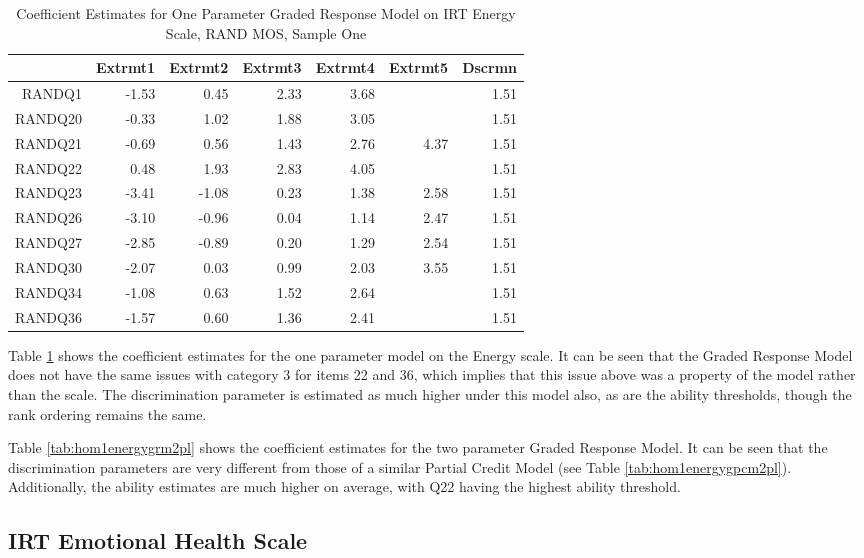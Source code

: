 \documentclass{article}
\begin{document}
\begin{table}[ht]
\centering
\begin{tabular}{rrrrrrr}
  \hline
 & Extrmt1 & Extrmt2 & Extrmt3 & Extrmt4 & Extrmt5 & Dscrmn \\ 
  \hline
RANDQ1 & -1.53 & 0.45 & 2.33 & 3.68 &  & 1.51 \\ 
  RANDQ20 & -0.33 & 1.02 & 1.88 & 3.05 &  & 1.51 \\ 
  RANDQ21 & -0.69 & 0.56 & 1.43 & 2.76 & 4.37 & 1.51 \\ 
  RANDQ22 & 0.48 & 1.93 & 2.83 & 4.05 &  & 1.51 \\ 
  RANDQ23 & -3.41 & -1.08 & 0.23 & 1.38 & 2.58 & 1.51 \\ 
  RANDQ26 & -3.10 & -0.96 & 0.04 & 1.14 & 2.47 & 1.51 \\ 
  RANDQ27 & -2.85 & -0.89 & 0.20 & 1.29 & 2.54 & 1.51 \\ 
  RANDQ30 & -2.07 & 0.03 & 0.99 & 2.03 & 3.55 & 1.51 \\ 
  RANDQ34 & -1.08 & 0.63 & 1.52 & 2.64 &  & 1.51 \\ 
  RANDQ36 & -1.57 & 0.60 & 1.36 & 2.41 &  & 1.51 \\ 
   \hline
\end{tabular}
\caption{Coefficient Estimates for One Parameter Graded Response Model on IRT Energy Scale, RAND MOS, Sample One} 
\label{tab:hom1energygrm1pl}
\end{table}
Table \ref{tab:hom1energygrm1pl} shows the coefficient estimates for the one parameter model on the Energy scale. It can be seen that the Graded Response Model does not have the same issues with category 3 for items 22 and 36, which implies that this issue above was a property of the model rather than the scale. The discrimination parameter is estimated as much higher under this model also, as are the ability thresholds, though the rank ordering remains the same. 



Table \ref{tab:hom1energygrm2pl} shows the coefficient estimates for the two parameter Graded Response Model. It can be seen that the discrimination parameters are very different from those of a similar Partial Credit Model (see Table \ref{tab:hom1energygpcm2pl}). Additionally, the ability estimates are much higher on average, with Q22 having the highest ability threshold. 



\subsection{IRT Emotional Health Scale}
\end{document}

